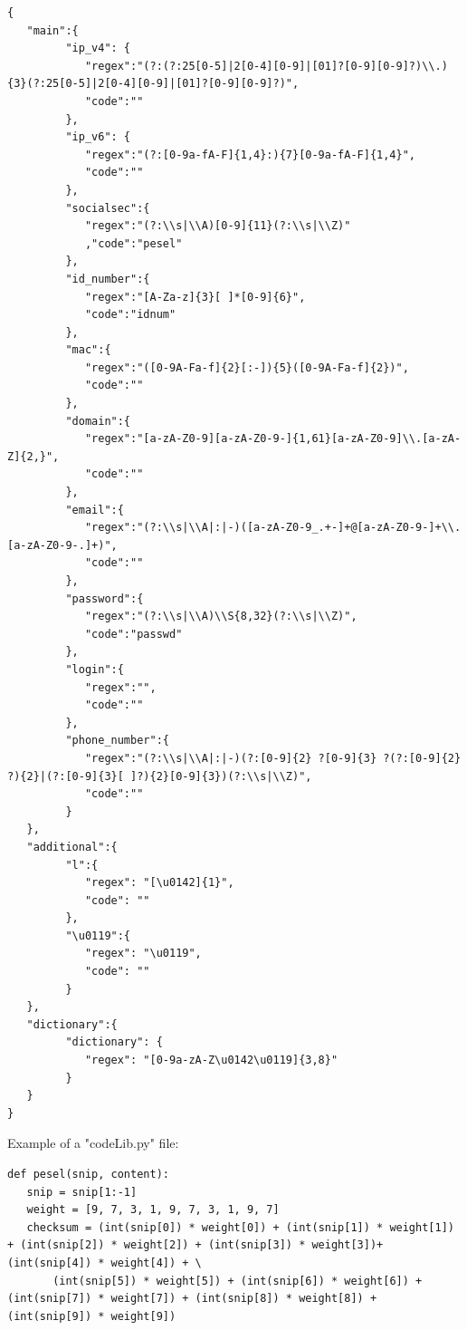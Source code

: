 \documentclass[a4paper,twoside,12pt]{book}
\begin{document}
\begin{appendices}
\begin{lstlisting}
{
   "main":{
         "ip_v4": {
            "regex":"(?:(?:25[0-5]|2[0-4][0-9]|[01]?[0-9][0-9]?)\\.){3}(?:25[0-5]|2[0-4][0-9]|[01]?[0-9][0-9]?)",
            "code":""
         },
         "ip_v6": {
            "regex":"(?:[0-9a-fA-F]{1,4}:){7}[0-9a-fA-F]{1,4}",
            "code":""
         },
         "socialsec":{
            "regex":"(?:\\s|\\A)[0-9]{11}(?:\\s|\\Z)"
            ,"code":"pesel"
         },
         "id_number":{
            "regex":"[A-Za-z]{3}[ ]*[0-9]{6}",
            "code":"idnum"
         },
         "mac":{
            "regex":"([0-9A-Fa-f]{2}[:-]){5}([0-9A-Fa-f]{2})",
            "code":""
         },
         "domain":{
            "regex":"[a-zA-Z0-9][a-zA-Z0-9-]{1,61}[a-zA-Z0-9]\\.[a-zA-Z]{2,}",
            "code":""
         },
         "email":{
            "regex":"(?:\\s|\\A|:|-)([a-zA-Z0-9_.+-]+@[a-zA-Z0-9-]+\\.[a-zA-Z0-9-.]+)",
            "code":""
         },
         "password":{
            "regex":"(?:\\s|\\A)\\S{8,32}(?:\\s|\\Z)",
            "code":"passwd"
         },
         "login":{
            "regex":"",
            "code":""
         },
         "phone_number":{
            "regex":"(?:\\s|\\A|:|-)(?:[0-9]{2} ?[0-9]{3} ?(?:[0-9]{2} ?){2}|(?:[0-9]{3}[ ]?){2}[0-9]{3})(?:\\s|\\Z)",
            "code":""
         }
   },
   "additional":{
         "l":{
            "regex": "[\u0142]{1}",
            "code": ""
         },
         "\u0119":{
            "regex": "\u0119",
            "code": ""
         }
   },
   "dictionary":{
         "dictionary": {
            "regex": "[0-9a-zA-Z\u0142\u0119]{3,8}"
         }
   }
}
\end{lstlisting}

Example of a "codeLib.py" file:

\begin{lstlisting}
def pesel(snip, content):
   snip = snip[1:-1]
   weight = [9, 7, 3, 1, 9, 7, 3, 1, 9, 7]
   checksum = (int(snip[0]) * weight[0]) + (int(snip[1]) * weight[1]) + (int(snip[2]) * weight[2]) + (int(snip[3]) * weight[3])+ (int(snip[4]) * weight[4]) + \
       (int(snip[5]) * weight[5]) + (int(snip[6]) * weight[6]) + (int(snip[7]) * weight[7]) + (int(snip[8]) * weight[8]) + (int(snip[9]) * weight[9])


\end{lstlisting}
\end{appendices}
\end{document}
